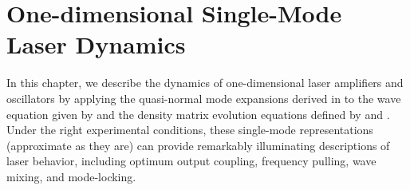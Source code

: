 %
%
%

 \chapter{One-dimensional Single-Mode Laser Dynamics\label{chp:laser_dynamics_1d_sml}}

In this chapter, we describe the dynamics of one-dimensional laser amplifiers and oscillators by applying the quasi-normal mode expansions derived in  to the wave equation given by  and the density matrix evolution equations defined by  and . Under the right experimental conditions, these single-mode representations (approximate as they are) can provide remarkably illuminating descriptions of laser behavior, including optimum output coupling, frequency pulling, wave mixing, and mode-locking.





